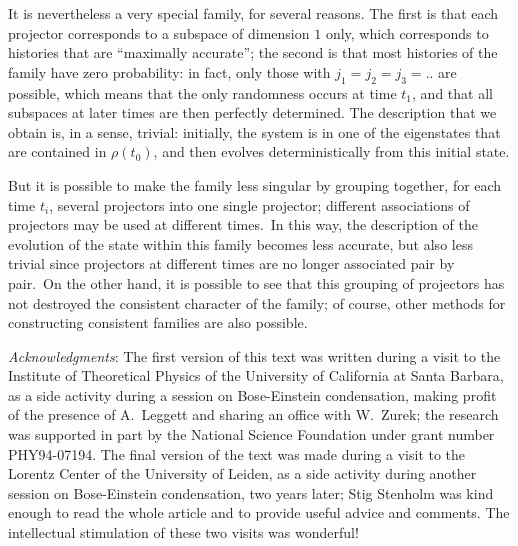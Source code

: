 \documentclass[12pt,onecolumn]{article}%
\begin{document}
It is nevertheless a very special family, for several reasons. The first is
that each projector corresponds to a subspace of dimension $1$ only, which
corresponds to histories that are ``maximally accurate''; the second is that
most histories of the family have zero probability: in fact, only those with
$j_{1}=j_{2}=j_{3}=..$ are possible, which means that the only randomness
occurs at time $t_{1}$, and that all subspaces at later times are then
perfectly determined. The description that we obtain is, in a sense, trivial:
initially, the system is in one of the eigenstates that are contained in
$\rho(t_{0})$, and then evolves deterministically from this initial state.

But it is possible to make the family less singular by grouping together, for
each time $t_{i}$, several projectors into one single projector; different
associations of projectors may be used at different times.\ In this way, the
description of the evolution of the state within this family becomes less
accurate, but also less trivial since projectors at different times are no
longer associated pair by pair.\ On the other hand, it is possible to see that
this grouping of projectors has not destroyed the consistent character of the
family; of course, other methods for constructing consistent families are also possible.

\begin{center}
\bigskip
\end{center}

\textit{Acknowledgments}: The first version of this text was written during a
visit to the Institute of Theoretical Physics of the University of California
at Santa Barbara, as a side activity during a session on Bose-Einstein
condensation, making profit of the presence of A.\ Leggett and sharing an
office with W.\ Zurek; the research was supported in part by the National
Science Foundation under grant number PHY94-07194. The final version of the
text was made during a visit to the Lorentz Center of the University of
Leiden, as a side activity during another session on Bose-Einstein
condensation, two years later; Stig Stenholm was kind enough to read the whole
article and to provide useful advice and comments. The intellectual
stimulation of these two visits was wonderful!
\end{document}
